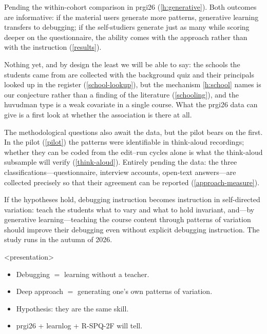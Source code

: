 \rqgenerative*
Pending the within-cohort comparison in prgi26 (\cref{h:generative}).
Both outcomes are informative: if the material users generate more
patterns, generative learning transfers to debugging; if the self-studiers
generate just as many while scoring deeper on the questionnaire, the
ability comes with the approach rather than with the instruction
(\cref{results}).

\rqschool*
Nothing yet, and by design the least we will be able to say: the schools
the students came from are collected with the background quiz and their
principals looked up in the register (\cref{school-lookup}), but the
mechanism \cref{h:school} names is our conjecture rather than a finding
of the literature (\cref{schooling}), and the huvudman type is a weak
covariate in a single course.
What the prgi26 data can give is a first look at whether the association
is there at all.

The methodological questions also await the data, but the pilot bears on
the first.
\mqcoding*
In the pilot (\cref{pilot}) the patterns were identifiable in think-aloud
recordings; whether they can be coded from the edit--run cycles alone is
what the think-aloud subsample will verify (\cref{think-aloud}).
\mqagreement*
Entirely pending the data: the three classifications---questionnaire,
interview accounts, open-text answers---are collected precisely so that
their agreement can be reported (\cref{approach-measure}).

If the hypotheses hold, debugging instruction becomes instruction in
self-directed variation: teach the students what to vary and what to hold
invariant, and---by generative learning---teaching the course content
through patterns of variation should improve their debugging even without
explicit debugging instruction.
The study runs in the autumn of 2026.

\begin{frame}<presentation>
  \begin{idea}
    \begin{itemize}
      \item Debugging \(=\) learning without a teacher.
      \item Deep approach \(=\) generating one's own patterns of variation.
      \item Hypothesis: they are the same skill.
      \item prgi26 + learnlog + R-SPQ-2F will tell.
    \end{itemize}
  \end{idea}
\end{frame}
